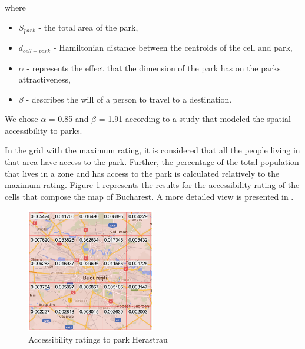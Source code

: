 where

\begin{itemize}
\item \( S_{park} \) - the total area of the park,
\item \(d_{cell-park}\) - Hamiltonian distance between the centroids of the cell and park,
\item \(\alpha\) - represents the effect that the dimension of the park has on the parks attractiveness,
\item \(\beta\) - describes the will of a person to travel to a destination.
\end{itemize}

We chose \(\alpha\) = 0.85 and \(\beta\) = 1.91 according to a study \cite{zhang2011modeling} that modeled the spatial accessibility to parks.

In the grid with the maximum rating, it is considered that all the people living in that area have access to the park. Further, the percentage of the total population that lives in a zone and has access to the park is calculated relatively to the maximum rating. Figure \ref{fig:access} represents the results for the accessibility rating of the cells that compose the map of Bucharest. A more detailed view is presented in .

\begin{figure}
    \centering
    \includegraphics[width=0.5\textwidth]{src/img/Bucharest-Rating.png}
    \caption{Accessibility ratings to park Herastrau}
    \label{fig:access}
\end{figure}



